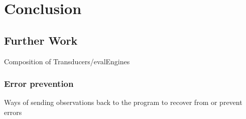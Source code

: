 %
\chapter{Conclusion}
\label{sec:conclusion}

\section{Further Work}

Composition of Transducers/evalEngines

\subsection{Error prevention}
Ways of sending observations back to the program to recover from or prevent errors


